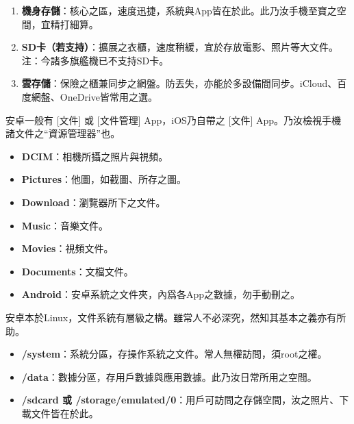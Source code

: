 


\begin{enumerate}
  \item \textbf{機身存儲}：核心之區，速度迅捷，系統與App皆在於此。此乃汝手機至寶之空間，宜精打細算。
  \item \textbf{SD卡（若支持）}：擴展之衣櫃，速度稍緩，宜於存放電影、照片等大文件。注：今諸多旗艦機已不支持SD卡。
  \item \textbf{雲存儲}：保險之櫃兼同步之網盤。防丟失，亦能於多設備間同步。iCloud、百度網盤、OneDrive皆常用之選。
\end{enumerate}


安卓一般有 [文件] 或 [文件管理] App，iOS乃自帶之 [文件] App。乃汝檢視手機諸文件之“資源管理器”也。


\begin{itemize}
  \item \textbf{DCIM}：相機所攝之照片與視頻。
  \item \textbf{Pictures}：他圖，如截圖、所存之圖。
  \item \textbf{Download}：瀏覽器所下之文件。
  \item \textbf{Music}：音樂文件。
  \item \textbf{Movies}：視頻文件。
  \item \textbf{Documents}：文檔文件。
  \item \textbf{Android}：安卓系統之文件夾，內爲各App之數據，勿手動刪之。
\end{itemize}


安卓本於Linux，文件系統有層級之構。雖常人不必深究，然知其基本之義亦有所助。


\begin{itemize}
  \item \textbf{/system}：系統分區，存操作系統之文件。常人無權訪問，須root之權。
  \item \textbf{/data}：數據分區，存用戶數據與應用數據。此乃汝日常所用之空間。
  \item \textbf{/sdcard 或 /storage/emulated/0}：用戶可訪問之存儲空間，汝之照片、下載文件皆在於此。
\end{itemize}


